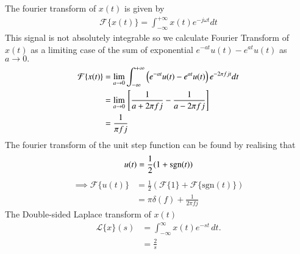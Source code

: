 \documentclass[journal,12pt,twocolumn]{IEEEtran}
\begin{document}
The fourier transform of $x(t)$ is given by
\begin{align}
     \mathcal{F} \{x(t)\}= \int_{ - \infty }^{ + \infty } x(t){e^{ - j\omega t}}dt
\end{align}
This signal is not absolutely integrable so we calculate Fourier Transform of $x(t)$ as a limiting case of the sum of exponential $e^{-at}u(t) - e^{at}u(t)$ as $a \to 0.$
\begin{align}
    \mathcal{F} \{x(t)\}&=\lim_{a \to 0} \int_{ - \infty }^{ + \infty } \left(e^{-at}u(t) - e^{at}u(t)\right){e^{ - 2\pi fj t}}dt\\
    &=\lim_{a \to 0}{}\left[\frac{1}{a  +  2\pi fj}  -  \frac{1}{a  - 2\pi f j}\right]\\
    &=\frac{1}{\pi f j}
\end{align}
The fourier transform of the unit step function can be found by realising that
\begin{align}
u(t)=\frac12(1+\mathop{\mathrm{sgn}}(t))    
\end{align}
\begin{align}
 \implies   \mathcal{F}\{u(t)\}&=\frac12\left(\mathcal{F}\{1\}+\mathcal{F}\{\text{sgn}(t)\}\right)\\&=\pi\delta(f)+\frac{1}{2\pi fj}
\end{align}
The Double-sided Laplace transform of $x(t)$
\begin{align}
    \mathcal{L}\{x\}(s) &= \int_{-\infty}^{\infty} x(t)e^{-st} \, dt.\\
    &=\frac{2}{s}
\end{align}
\end{document}
